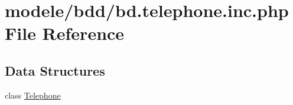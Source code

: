 \hypertarget{bd_8telephone_8inc_8php}{}\section{modele/bdd/bd.telephone.\+inc.\+php File Reference}
\label{bd_8telephone_8inc_8php}
\subsection*{Data Structures}
\begin{DoxyCompactItemize}
\item 
class \hyperlink{class_telephone}{Telephone}
\end{DoxyCompactItemize}
